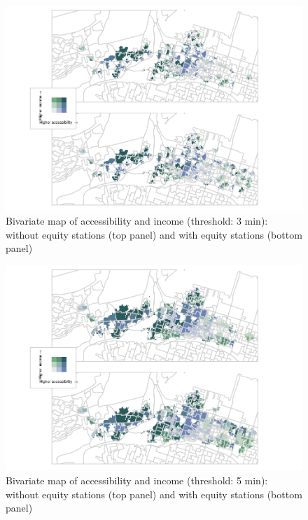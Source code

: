 \documentclass[]{elsarticle} %
\begin{document}
\begin{figure}
\includegraphics[width=1\linewidth]{Bike-share-spatial-equity_files/figure-latex/figure-bi-map-threshold-3-1} \caption{\label{fig-bivariate-map-threshold-3}Bivariate map of accessibility and income (threshold: 3 min): without equity stations (top panel) and with equity stations (bottom panel)}\label{fig:figure-bi-map-threshold-3}
\end{figure}

\begin{figure}
\includegraphics[width=1\linewidth]{Bike-share-spatial-equity_files/figure-latex/figure-bi-map-threshold-5-1} \caption{\label{fig-bivariate-map-threshold-5}Bivariate map of accessibility and income (threshold: 5 min): without equity stations (top panel) and with equity stations (bottom panel)}\label{fig:figure-bi-map-threshold-5}
\end{figure}
\end{document}

